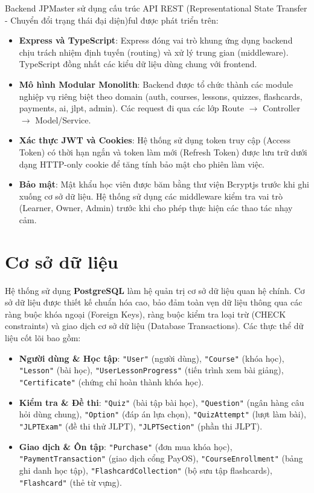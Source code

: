 \documentclass[../DoAn.tex]{subfiles}
\begin{document}
Backend JPMaster sử dụng cấu trúc API REST (Representational State Transfer - Chuyển đổi trạng thái đại diện)ful được phát triển trên:
\begin{itemize}
    \item \textbf{Express và TypeScript}: Express đóng vai trò khung ứng dụng backend chịu trách nhiệm định tuyến (routing) và xử lý trung gian (middleware). TypeScript đồng nhất các kiểu dữ liệu dùng chung với frontend.
    \item \textbf{Mô hình Modular Monolith}: Backend được tổ chức thành các module nghiệp vụ riêng biệt theo domain (auth, courses, lessons, quizzes, flashcards, payments, ai, jlpt, admin). Các request đi qua các lớp Route $\rightarrow$ Controller $\rightarrow$ Model/Service.
    \item \textbf{Xác thực JWT và Cookies}: Hệ thống sử dụng token truy cập (Access Token) có thời hạn ngắn và token làm mới (Refresh Token) được lưu trữ dưới dạng HTTP-only cookie để tăng tính bảo mật cho phiên làm việc.
    \item \textbf{Bảo mật}: Mật khẩu học viên được băm bằng thư viện Bcryptjs trước khi ghi xuống cơ sở dữ liệu. Hệ thống sử dụng các middleware kiểm tra vai trò (Learner, Owner, Admin) trước khi cho phép thực hiện các thao tác nhạy cảm.
\end{itemize}

\section{Cơ sở dữ liệu}
\label{section:3.3}

Hệ thống sử dụng \textbf{PostgreSQL} làm hệ quản trị cơ sở dữ liệu quan hệ chính. Cơ sở dữ liệu được thiết kế chuẩn hóa cao, bảo đảm toàn vẹn dữ liệu thông qua các ràng buộc khóa ngoại (Foreign Keys), ràng buộc kiểm tra loại trừ (CHECK constraints) và giao dịch cơ sở dữ liệu (Database Transactions). Các thực thể dữ liệu cốt lõi bao gồm:
\begin{itemize}
    \item \textbf{Người dùng \& Học tập}: \texttt{"User"} (người dùng), \texttt{"Course"} (khóa học), \texttt{"Lesson"} (bài học), \texttt{"UserLessonProgress"} (tiến trình xem bài giảng), \texttt{"Certificate"} (chứng chỉ hoàn thành khóa học).
    \item \textbf{Kiểm tra \& Đề thi}: \texttt{"Quiz"} (bài tập bài học), \texttt{"Question"} (ngân hàng câu hỏi dùng chung), \texttt{"Option"} (đáp án lựa chọn), \texttt{"QuizAttempt"} (lượt làm bài), \texttt{"JLPTExam"} (đề thi thử JLPT), \texttt{"JLPTSection"} (phần thi JLPT).
    \item \textbf{Giao dịch \& Ôn tập}: \texttt{"Purchase"} (đơn mua khóa học), \texttt{"PaymentTransaction"} (giao dịch cổng PayOS), \texttt{"CourseEnrollment"} (bảng ghi danh học tập), \texttt{"FlashcardCollection"} (bộ sưu tập flashcards), \texttt{"Flashcard"} (thẻ từ vựng).
\end{itemize}
\end{document}
